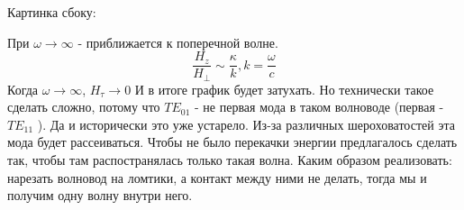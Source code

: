 \begin{enumerate}
	 Картинка сбоку:

	 При $\omega  \rightarrow \infty $ - приближается к поперечной волне.
	 \begin{equation}
	 	\frac{H_z}{H_{\perp}} \sim \frac{\kappa}{k}, k = \frac{\omega}{c}
	 \end{equation}
	 Когда $\omega  \rightarrow \infty $, $H_{\tau} \rightarrow 0$
	 И в итоге график будет затухать.
	 Но технически такое сделать сложно, потому что $TE_{01}$ - не первая мода в таком волноводе (первая - $TE_{11}$ ). Да и исторически это уже устарело. Из-за различных шероховатостей эта мода будет рассеиваться. Чтобы не было перекачки энергии предлагалось сделать так, чтобы там распостранялась только такая волна. Каким образом реализовать: нарезать волновод на ломтики, а контакт между ними не делать, тогда мы и получим одну волну внутри него.
\end{enumerate}